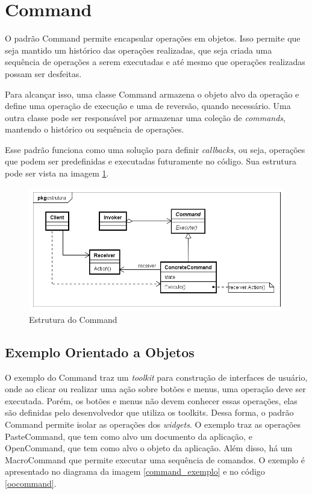 \section{Command}

O padrão Command permite encapsular operações 
em objetos. Isso permite que seja mantido um 
histórico das operações realizadas, que seja 
criada uma sequência de operações a serem 
executadas e até mesmo que operações realizadas 
possam ser desfeitas.\cite{gamma:1995}

Para alcançar isso, uma classe Command armazena o 
objeto alvo da operação e define uma operação 
de execução e uma de reversão, quando necessário. 
Uma outra classe pode ser responsável por armazenar 
uma coleção de \textit{commands}, mantendo o 
histórico ou sequência de operações. 

Esse padrão funciona como uma solução para definir 
\textit{callbacks}, ou seja, operações que podem ser 
predefinidas e executadas futuramente no código. Sua 
estrutura pode ser vista na imagem \ref{command_struct}.

\begin{figure}[htb]
	\caption{\label{command_struct}Estrutura do Command}
	\begin{center}
	    \includegraphics[scale=0.5]{5_padroes-contexto-funcional/5.3_comportamentais/5.3.02_command/command_struct.png}
	\end{center}
\end{figure}

\subsection*{Exemplo Orientado a Objetos}

O exemplo do Command traz um \textit{toolkit} para 
construção de interfaces de usuário, onde ao clicar 
ou realizar uma ação sobre botões e menus, uma 
operação deve ser executada. Porém, os botões e 
menus não devem conhecer essas operações, elas são 
definidas pelo desenvolvedor que utiliza os toolkits. 
Dessa forma, o padrão Command permite isolar as 
operações dos \textit{widgets}. O exemplo traz as 
operações PasteCommand, que tem como alvo um 
documento da aplicação, e OpenCommand, que tem como 
alvo o objeto da aplicação. Além disso, há um 
MacroCommand que permite executar uma sequência 
de comandos. O exemplo é apresentado no diagrama da 
imagem \ref{command_exemplo} e no código \ref{oocommand}.


